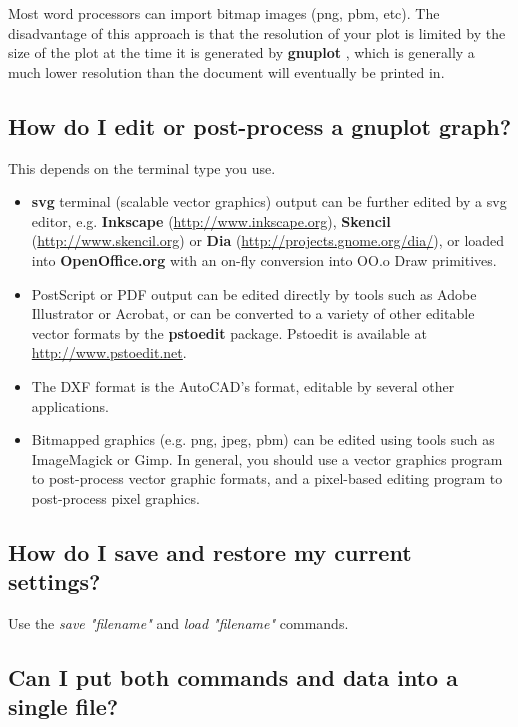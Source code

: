 \documentclass[letter,11pt]{article}
\def\http#1{{\small\href{http://#1}{\url{http://#1}}}}
\newcommand{\http}[1]%
            {\htmladdnormallink{\latex{\url{http://#1}}%
                    \html{\textit{http://#1}}}%
                {http://#1}%
            }
\newcommand{\gnuplot}{\textbf{gnuplot }}
\begin{document}
{Most word processors can import bitmap images (png, pbm, etc).
The disadvantage of this approach is that the resolution of your
plot is limited by the size of the plot at the time it is generated
by \gnuplot, which is generally a much lower resolution than the
document will eventually be printed in.


\subsection{How do I edit or post-process a \gnuplot graph?}

This depends on the terminal type you use.

\begin{itemize}

\item \textbf{svg} terminal (scalable vector graphics) output can
be further edited by a svg editor, e.g.
\textbf{Inkscape} (\http{www.inkscape.org}),
\textbf{Skencil} (\http{www.skencil.org}) or
\textbf{Dia} (\http{projects.gnome.org/dia/}), or loaded
into \textbf{OpenOffice.org} with an on-fly conversion into OO.o Draw
primitives.

\item PostScript or PDF output can be edited directly by tools such
as Adobe Illustrator or Acrobat, or can be converted to a variety
of other editable vector formats by the \textbf{pstoedit} package.
Pstoedit is available at \http{www.pstoedit.net}.

\item The DXF format is the AutoCAD's format, editable by several
other applications.

\item Bitmapped graphics (e.g. png, jpeg, pbm) can be edited using
tools such as ImageMagick or Gimp.
In general, you should use a vector graphics program to post-process
vector graphic formats, and a pixel-based editing program
to post-process pixel graphics.

\end{itemize}

\subsection{How do I save and restore my current settings?}

Use the {\em save "filename"} and {\em load "filename"} commands.

\subsection{Can I put both commands and data into a single file?}

}
\end{document}

